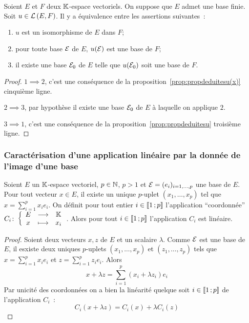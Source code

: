 \begin{theo}
Soient $E$ et $F$ deux $\mathbb{K}$-espace vectoriels. On suppose que $E$ admet une base finie. Soit $u \in \mathcal{L}\left(E,F\right)$. Il y a équivalence entre les assertions suivantes~:
\begin{enumerate}
\item $u$ est un isomorphisme de $E$ dans $F$;
\item pour toute base $\mathcal{E}$ de $E$, $u(\mathcal{E})$ est une base de $F$;
\item il existe une base $\mathcal{E}_0$ de $E$ telle que $u(\mathcal{E}_0)$ soit une base de $F$.
\end{enumerate}
\end{theo}
\begin{proof}
  $1 \implies 2$, c'est une conséquence de la proposition~\ref{prop:propdeduitesu(x)} cinquième ligne.

  $2 \implies 3$, par hypothèse il existe une base $\mathcal{E}_0$ de $E$ à laquelle on applique $2$.

  $3 \implies 1$, c'est une conséquence de la proposition~\ref{prop:propdeduitesu} troisième ligne.
\end{proof}

\subsubsection{Caractérisation d'une application linéaire par la donnée de l'image d'une base}

\begin{lemme}
  Soient $E$ un $\mathbb{K}$-espace vectoriel, $p \in \mathbb{N}$, $p>1$ et $\mathcal{E}=(e_i)_{i=1, \ldots, p}$ une base de $E$. Pour tout vecteur $x \in E$, il existe un unique $p$-uplet $(x_1, \ldots, x_p)$ tel que $x = \sum_{i=1}^p x_ie_i$. On définit pour tout entier $i \in \mathopen{\llbracket}1\mathclose{}\mathpunct{};p\mathclose{\rrbracket}$ l'application ``coordonnée'' $C_i\colon \left\{\begin{array}{ccc} E & \longrightarrow &\mathbb{K}\\ x & \longmapsto & x_i \end{array} \right.$. Alors pour tout $i \in \mathopen{\llbracket}1\mathclose{}\mathpunct{};p\mathclose{\rrbracket}$ l'application $C_i$ est linéaire.
\end{lemme}
\begin{proof}
  Soient deux vecteurs $x,z$ de $E$ et un scalaire $\lambda$. Comme $\mathcal{E}$ est une base de $E$, il esxiste deux uniques $p$-uplets $(x_1, \ldots, x_p)$ et $(z_1, \ldots, z_p)$ tels que $x = \sum_{i=1}^p x_ie_i$ et $z = \sum_{i=1}^p z_ie_i$. Alors
  \begin{equation}
    x+\lambda z = \sum_{i=1}^p (x_i + \lambda z_i)e_i
  \end{equation}
  Par unicité des coordonnées on a bien la linéarité quelque soit $i \in \mathopen{\llbracket}1\mathclose{}\mathpunct{};p\mathclose{\rrbracket}$ de l'application $C_i$~:
  \begin{equation}
    C_i(x+\lambda z)=C_i(x)+\lambda C_i(z)
  \end{equation}
\end{proof}

